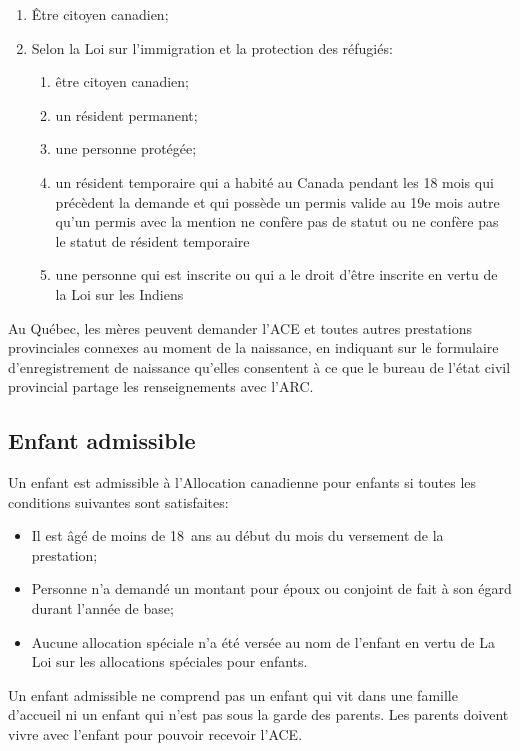 \begin{enumerate}
\begin{enumerate}
\begin{enumerate}
			\item Être citoyen canadien;
			\item Selon la Loi sur l'immigration et la protection des réfugiés:
			\begin{enumerate}
				\item être citoyen canadien;
				\item un résident permanent;
				\item une personne protégée;
				\item un résident temporaire qui a habité au Canada pendant les 18 mois qui précèdent la demande et qui possède un permis valide au 19e mois autre qu'un permis avec la mention \og ne confère pas de statut \fg{} ou \og ne confère pas le statut de résident temporaire \fg{}
				\item une personne qui est inscrite ou qui a le droit d'être inscrite en vertu de la Loi sur les Indiens
			\end{enumerate}
		\end{enumerate}
	\end{enumerate}
\end{enumerate}

Au Québec, les mères peuvent demander l'ACE et toutes autres prestations provinciales connexes au moment de la naissance, en indiquant sur le formulaire d'enregistrement de naissance qu'elles consentent à ce que le bureau de l'état civil provincial partage les renseignements avec l'ARC.


\subsection{Enfant admissible}
Un enfant est admissible à l'Allocation canadienne pour enfants si toutes les conditions suivantes sont satisfaites:
\begin{itemize}
	\item Il est âgé de moins de 18~ans au début du mois du versement de la prestation;
	\item Personne n'a demandé un montant pour époux ou conjoint de fait à son égard durant l'année de base;
	\item Aucune allocation spéciale n'a été versée au nom de l'enfant en vertu de La Loi sur les allocations spéciales pour enfants.
\end{itemize}

\begin{note}
	Un enfant admissible ne comprend pas un enfant qui vit dans une famille d'accueil ni un enfant qui n'est pas sous la garde des parents. Les parents doivent vivre avec l'enfant pour pouvoir recevoir l'ACE.
\end{note}

